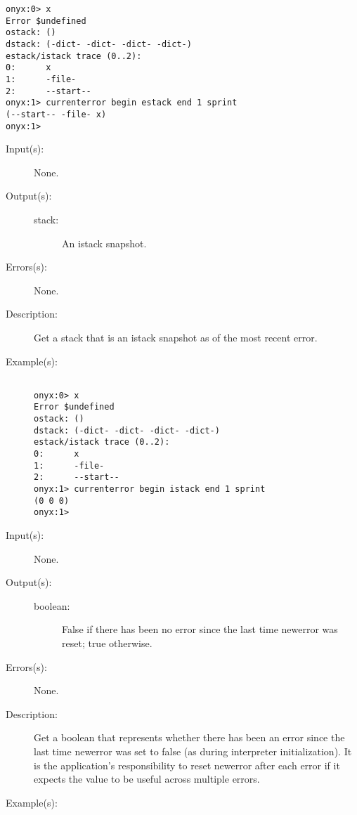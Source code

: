 \begin{description}
\begin{description}
\begin{verbatim}
onyx:0> x
Error $undefined
ostack: ()
dstack: (-dict- -dict- -dict- -dict-)
estack/istack trace (0..2):
0:      x
1:      -file-
2:      --start--
onyx:1> currenterror begin estack end 1 sprint
(--start-- -file- x)
onyx:1>
		\end{verbatim}
	\end{description}
\label{currenterror:istack}
\item[{\onyxop{--}{istack}{stack}}: ]
	\begin{description}\item[]
	\item[Input(s): ] None.
	\item[Output(s): ]
		\begin{description}\item[]
		\item[stack: ]
			An istack snapshot.
		\end{description}
	\item[Errors(s): ] None.
	\item[Description: ]
		Get a stack that is an istack snapshot as of the most recent
		error.
	\item[Example(s): ]\begin{verbatim}

onyx:0> x
Error $undefined
ostack: ()
dstack: (-dict- -dict- -dict- -dict-)
estack/istack trace (0..2):
0:      x
1:      -file-
2:      --start--
onyx:1> currenterror begin istack end 1 sprint
(0 0 0)
onyx:1>
		\end{verbatim}
	\end{description}
\label{currenterror:newerror}
\item[{\onyxop{--}{newerror}{boolean}}: ]
	\begin{description}\item[]
	\item[Input(s): ] None.
	\item[Output(s): ]
		\begin{description}\item[]
		\item[boolean: ]
			False if there has been no error since the last time
			newerror was reset; true otherwise.
		\end{description}
	\item[Errors(s): ] None.
	\item[Description: ]
		Get a boolean that represents whether there has been an error
		since the last time newerror was set to false (as during
		interpreter initialization).  It is the application's
		responsibility to reset newerror after each error if it expects
		the value to be useful across multiple errors.
	\item[Example(s): ]\begin{verbatim}


\end{verbatim}
\end{description}
\end{description}
